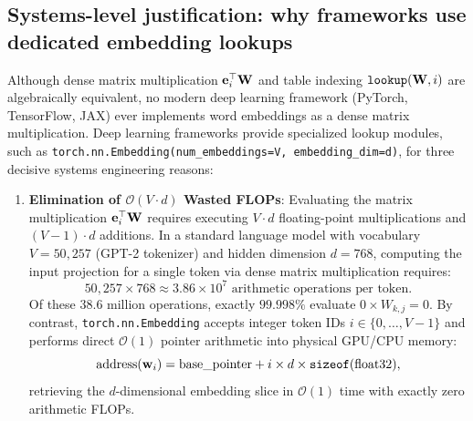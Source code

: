 \documentclass[../../main.tex]{subfiles}
\begin{document}
\subsection{Systems-level justification: why frameworks use dedicated embedding lookups}
\label{subsec:systems_embedding_justification}

Although dense matrix multiplication $\mathbf{e}_i^\top \mathbf{W}$ and table indexing $\text{\texttt{lookup}}(\mathbf{W}, i)$ are algebraically equivalent, no modern deep learning framework (PyTorch, TensorFlow, JAX) ever implements word embeddings as a dense matrix multiplication. Deep learning frameworks provide specialized lookup modules, such as \texttt{torch.nn.Embedding(num\_embeddings=V, embedding\_dim=d)}, for three decisive systems engineering reasons:

\begin{enumerate}
    \item \textbf{Elimination of $\mathcal{O}(V \cdot d)$ Wasted FLOPs}:
    Evaluating the matrix multiplication $\mathbf{e}_i^\top \mathbf{W}$ requires executing $V \cdot d$ floating-point multiplications and $(V-1) \cdot d$ additions. In a standard language model with vocabulary $V = 50{,}257$ (GPT-2 tokenizer) and hidden dimension $d = 768$, computing the input projection for a single token via dense matrix multiplication requires:
    \begin{equation}
    \label{eq:flops_wasted}
    50{,}257 \times 768 \approx 3.86 \times 10^7 \text{ arithmetic operations per token}.
    \end{equation}
    Of these $38.6$ million operations, exactly $99.998\%$ evaluate $0 \times W_{k, j} = 0$. By contrast, \texttt{torch.nn.Embedding} accepts integer token IDs $i \in \{0, \dots, V-1\}$ and performs direct $\mathcal{O}(1)$ pointer arithmetic into physical GPU/CPU memory:
    \begin{equation}
    \label{eq:pointer_arithmetic}
    \text{address}(\mathbf{w}_i) = \text{base\_pointer} + i \times d \times \text{\texttt{sizeof}}(\text{float32}),
    \end{equation}
    retrieving the $d$-dimensional embedding slice in $\mathcal{O}(1)$ time with exactly zero arithmetic FLOPs.


\end{enumerate}
\end{document}

